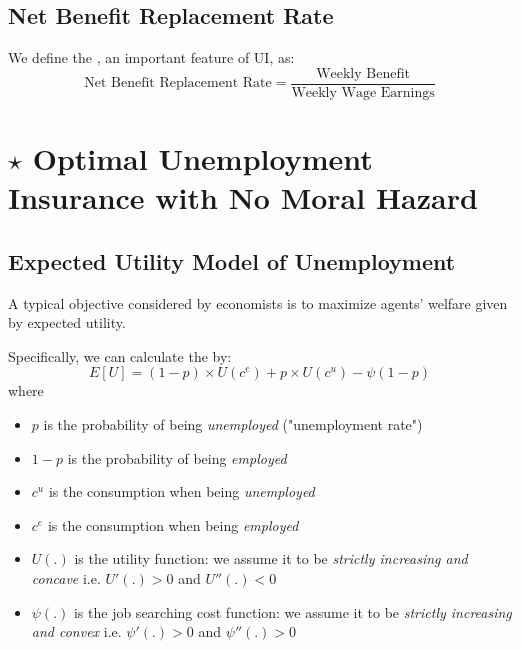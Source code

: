    \subsection{Net Benefit Replacement Rate}
        We define the , an important feature of UI, as:
        $$\text{Net\ Benefit\ Replacement\ Rate} = \frac{\text{Weekly\ Benefit}}{\text{Weekly\ Wage\ Earnings}}$$
        
\section{$\star$ Optimal Unemployment Insurance with No Moral Hazard}

    \subsection{Expected Utility Model of Unemployment}
        A typical objective considered by economists is to maximize agents' welfare given by expected utility.
        
        Specifically, we can calculate the  by:
        $$E[U] = (1-p)\times{U(c^e)} + p\times{U(c^u)} - \psi(1-p)$$
        where
        \begin{itemize}
            \item $p$ is the probability of being \emph{unemployed} ("unemployment rate")
            \item $1-p$ is the probability of being \emph{employed}
            \item $c^u$ is the consumption when being \emph{unemployed}
            \item $c^e$ is the consumption when being \emph{employed}
            \item $U(.)$ is the utility function: we assume it to be \emph{strictly increasing and concave} i.e. $U'(.)>0$ and $U''(.)<0$
            \item $\psi(.)$ is the job searching cost function: we assume it to be \emph{strictly increasing and convex} i.e. $\psi'(.)>0$ and $\psi''(.)>0$
        \end{itemize}
        
